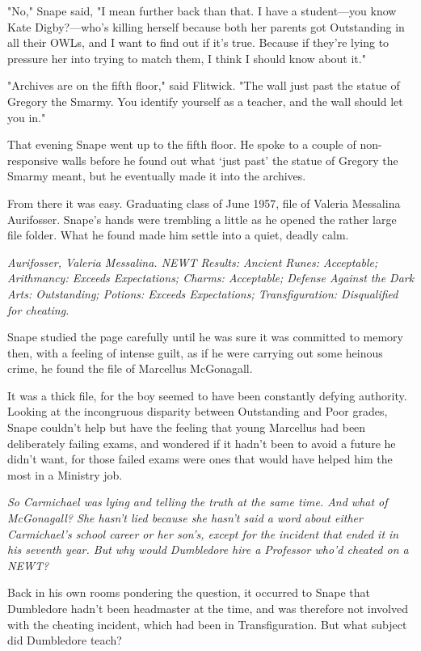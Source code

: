 "No," Snape said, "I mean further back than that. I have a student—you know Kate Digby?—who's killing herself because both her parents got Outstanding in all their OWLs, and I want to find out if it's true. Because if they're lying to pressure her into trying to match them, I think I should know about it."

"Archives are on the fifth floor," said Flitwick. "The wall just past the statue of Gregory the Smarmy. You identify yourself as a teacher, and the wall should let you in."

That evening Snape went up to the fifth floor. He spoke to a couple of non-responsive walls before he found out what `just past' the statue of Gregory the Smarmy meant, but he eventually made it into the archives.

From there it was easy. Graduating class of June 1957, file of Valeria Messalina Aurifosser. Snape's hands were trembling a little as he opened the rather large file folder. What he found made him settle into a quiet, deadly calm.

\emph{Aurifosser, Valeria Messalina. NEWT Results: Ancient Runes: Acceptable; Arithmancy: Exceeds Expectations; Charms: Acceptable; Defense Against the Dark Arts: Outstanding; Potions: Exceeds Expectations; Transfiguration: Disqualified for cheating.}

Snape studied the page carefully until he was sure it was committed to memory then, with a feeling of intense guilt, as if he were carrying out some heinous crime, he found the file of Marcellus McGonagall.

It was a thick file, for the boy seemed to have been constantly defying authority. Looking at the incongruous disparity between Outstanding and Poor grades, Snape couldn't help but have the feeling that young Marcellus had been deliberately failing exams, and wondered if it hadn't been to avoid a future he didn't want, for those failed exams were ones that would have helped him the most in a Ministry job.

\emph{So Carmichael was lying and telling the truth at the same time. And what of McGonagall? She hasn't lied because she hasn't said a word about either Carmichael's school career or her son's, except for the incident that ended it in his seventh year. But why would Dumbledore hire a Professor who'd cheated on a NEWT?}

Back in his own rooms pondering the question, it occurred to Snape that Dumbledore hadn't been headmaster at the time, and was therefore not involved with the cheating incident, which had been in Transfiguration. But what subject did Dumbledore teach?


